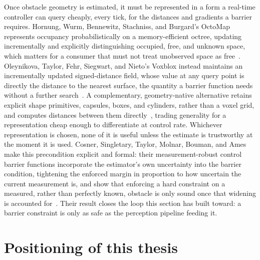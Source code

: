 \documentclass[12pt,a4paper,twoside,openright]{report}
\begin{document}
Once obstacle geometry is estimated, it must be represented in a form a real-time controller can query cheaply, every tick, for the distances and gradients a barrier requires. Hornung, Wurm, Bennewitz, Stachniss, and Burgard's OctoMap represents occupancy probabilistically on a memory-efficient octree, updating incrementally and explicitly distinguishing occupied, free, and unknown space, which matters for a consumer that must not treat unobserved space as free~\cite{hornung2013octomap}. Oleynikova, Taylor, Fehr, Siegwart, and Nieto's Voxblox instead maintains an incrementally updated signed-distance field, whose value at any query point is directly the distance to the nearest surface, the quantity a barrier function needs without a further search~\cite{oleynikova2017voxblox}. A complementary, geometry-native alternative retains explicit shape primitives, capsules, boxes, and cylinders, rather than a voxel grid, and computes distances between them directly~\cite{montaut2023diffcol}, trading generality for a representation cheap enough to differentiate at control rate. Whichever representation is chosen, none of it is useful unless the estimate is trustworthy at the moment it is used. Cosner, Singletary, Taylor, Molnar, Bouman, and Ames make this precondition explicit and formal: their measurement-robust control barrier functions incorporate the estimator's own uncertainty into the barrier condition, tightening the enforced margin in proportion to how uncertain the current measurement is, and show that enforcing a hard constraint on a measured, rather than perfectly known, obstacle is only sound once that widening is accounted for~\cite{cosner2021mrcbf}. Their result closes the loop this section has built toward: a barrier constraint is only as safe as the perception pipeline feeding it.

\section{Positioning of this thesis}
\label{sec:sota-positioning}
\end{document}
